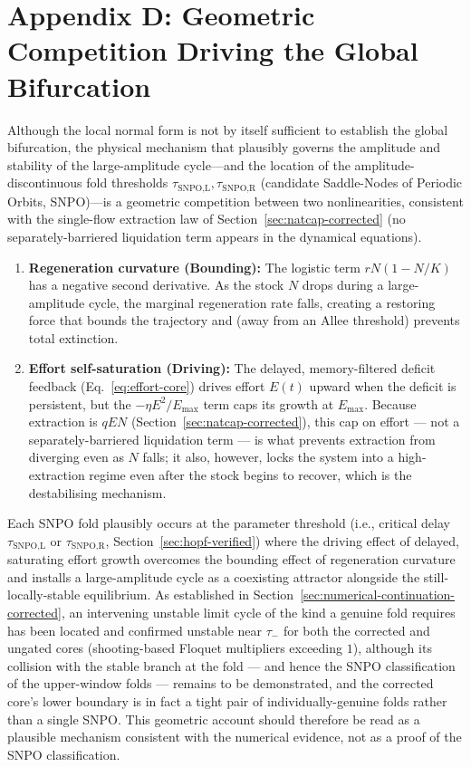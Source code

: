 \documentclass[twocolumn,10pt]{article}
\begin{document}
\section{Appendix D: Geometric Competition Driving the Global Bifurcation}
Although the local normal form \cite{faria1995} is not by itself sufficient to establish the global bifurcation, the physical mechanism that plausibly governs the amplitude and stability of the large-amplitude cycle---and the location of the amplitude-discontinuous fold thresholds $\tau_{\text{SNPO,L}},\tau_{\text{SNPO,R}}$ (candidate Saddle-Nodes of Periodic Orbits, SNPO)---is a geometric competition between two nonlinearities, consistent with the single-flow extraction law of Section~\ref{sec:natcap-corrected} (no separately-barriered liquidation term appears in the dynamical equations).
\begin{enumerate}
\item \textbf{Regeneration curvature (Bounding):} The logistic term \(rN(1-N/K)\) has a negative second derivative. As the stock \(N\) drops during a large-amplitude cycle, the marginal regeneration rate falls, creating a restoring force that bounds the trajectory and (away from an Allee threshold) prevents total extinction.
\item \textbf{Effort self-saturation (Driving):} The delayed, memory-filtered deficit feedback (Eq.~\eqref{eq:effort-core}) drives effort $E(t)$ upward when the deficit is persistent, but the $-\eta E^2/E_{\max}$ term caps its growth at $E_{\max}$. Because extraction is $qEN$ (Section~\ref{sec:natcap-corrected}), this cap on effort — not a separately-barriered liquidation term — is what prevents extraction from diverging even as $N$ falls; it also, however, locks the system into a high-extraction regime even after the stock begins to recover, which is the destabilising mechanism.
\end{enumerate}
Each SNPO fold plausibly occurs at the parameter threshold (i.e., critical delay $\tau_{\text{SNPO,L}}$ or $\tau_{\text{SNPO,R}}$, Section~\ref{sec:hopf-verified}) where the driving effect of delayed, saturating effort growth overcomes the bounding effect of regeneration curvature and installs a large-amplitude cycle as a coexisting attractor alongside the still-locally-stable equilibrium. As established in Section~\ref{sec:numerical-continuation-corrected}, an intervening unstable limit cycle of the kind a genuine fold requires has been located and confirmed unstable near $\tau_-$ for both the corrected and ungated cores (shooting-based Floquet multipliers exceeding $1$), although its collision with the stable branch at the fold --- and hence the SNPO classification of the upper-window folds --- remains to be demonstrated, and the corrected core's lower boundary is in fact a tight pair of individually-genuine folds rather than a single SNPO. This geometric account should therefore be read as a plausible mechanism consistent with the numerical evidence, not as a proof of the SNPO classification.
\end{document}
